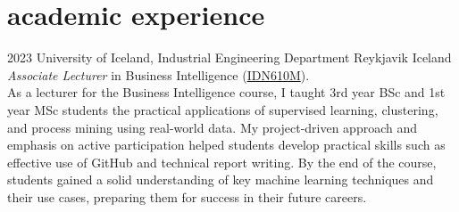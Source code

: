 \documentclass[]{cv} %
\begin{document}
\section{academic experience}
\begin{entrylist}
    \entry
	{2023}
	{University of Iceland, Industrial Engineering Department}
	{Reykjavik Iceland}
	{\emph{Associate Lecturer} in Business Intelligence (\href{https://ugla.hi.is/kennsluskra/index.php?tab=nam&chapter=namskeid&id=71001420230}{IDN610M}). \\
As a lecturer for the Business Intelligence course, I taught 3rd year BSc and 1st year MSc students the practical applications of supervised learning, clustering, and process mining using real-world data. My project-driven approach and emphasis on active participation helped students develop practical skills such as effective use of GitHub and technical report writing. By the end of the course, students gained a solid understanding of key machine learning techniques and their use cases, preparing them for success in their future careers.
	}
\end{entrylist}
\end{document}
